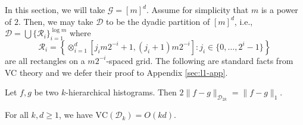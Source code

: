 \documentclass[final,12pt]{colt2018} %
\newcommand{\rect}{\mathcal{R}}
\newcommand{\hier}{\mathcal{D}}
\newcommand{\calG}{\mathcal{G}}
\newcommand{\VC}{\mathrm{VC}}
\begin{document}
In this section, we will take $\calG = [m]^d$.
Assume for simplicity that $m$ is a power of $2$.
Then, we may take $\hier$ to be the dyadic partition of $[m]^d$, i.e., $\hier = \bigcup \{ \rect_i \}_{i = 1}^{\log m}$ where 
\[
\rect_i = \left\{ \otimes_{i = 1}^d [j_i m 2^{-i} + 1, (j_i + 1) m 2^{-i}] : j_i \in \{0, \ldots, 2^{i} - 1\} \right\}
\]
are all rectangles on a $m 2^{-i}$-spaced grid.
The following are standard facts from VC theory and we defer their proof to Appendix \ref{sec:l1-app}.

\begin{corollary}
\label{cor:difference-of-histograms}
Let $f, g$ be two $k$-hierarchical histograms.
Then $2 \| f - g \|_{\hier_{2k}} = \| f - g \|_1$.
\end{corollary}


\begin{corollary}
\label{cor:VC-hierk}
For all $k, d \geq 1$, we have $\VC (\hier_k) = O(k d)$.
\end{corollary}
\end{document}
